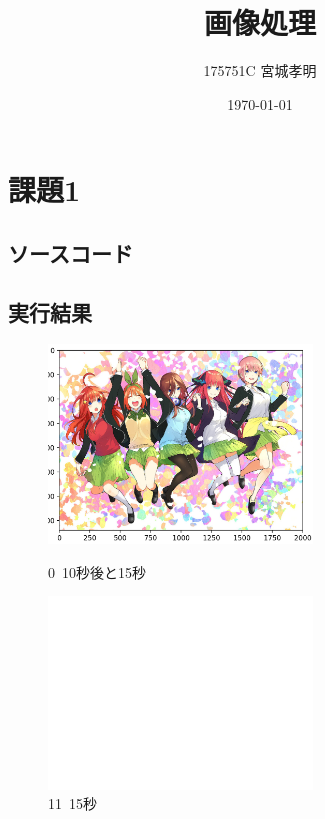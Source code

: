 \documentclass[a4paper,11pt,titlepage]{bxjsarticle}
\title{画像処理}
\author{175751C 宮城孝明}
\date{\today}
\begin{document}
\maketitle
\tableofcontents
\clearpage
\section{課題1}
\subsection{ソースコード}

 \subsection{実行結果}
 \begin{figure}[htbp]
 \begin{minipage}{0.5\hsize}
  \begin{center}
   \includegraphics[width=70mm]{kadai1.png}
  \end{center}
  \caption{0~10秒後と15秒~}
  \label{fig:one}
 \end{minipage}
 \begin{minipage}{0.5\hsize}
  \begin{center}
   \includegraphics[width=70mm]{kadai1-1.png}
  \end{center}
  \caption{11~15秒}
  \label{fig:two}
 \end{minipage}
\end{figure}
\end{document}
